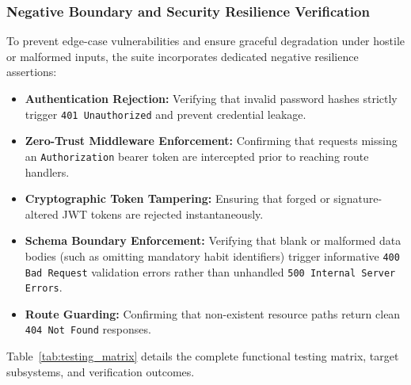 \subsubsection{Negative Boundary and Security Resilience Verification}
To prevent edge-case vulnerabilities and ensure graceful degradation under hostile or malformed inputs, the suite incorporates dedicated negative resilience assertions:
\begin{itemize}
    \item \textbf{Authentication Rejection:} Verifying that invalid password hashes strictly trigger \texttt{401 Unauthorized} and prevent credential leakage.
    \item \textbf{Zero-Trust Middleware Enforcement:} Confirming that requests missing an \texttt{Authorization} bearer token are intercepted prior to reaching route handlers.
    \item \textbf{Cryptographic Token Tampering:} Ensuring that forged or signature-altered JWT tokens are rejected instantaneously.
    \item \textbf{Schema Boundary Enforcement:} Verifying that blank or malformed data bodies (such as omitting mandatory habit identifiers) trigger informative \texttt{400 Bad Request} validation errors rather than unhandled \texttt{500 Internal Server Errors}.
    \item \textbf{Route Guarding:} Confirming that non-existent resource paths return clean \texttt{404 Not Found} responses.
\end{itemize}

Table~\ref{tab:testing_matrix} details the complete functional testing matrix, target subsystems, and verification outcomes.

